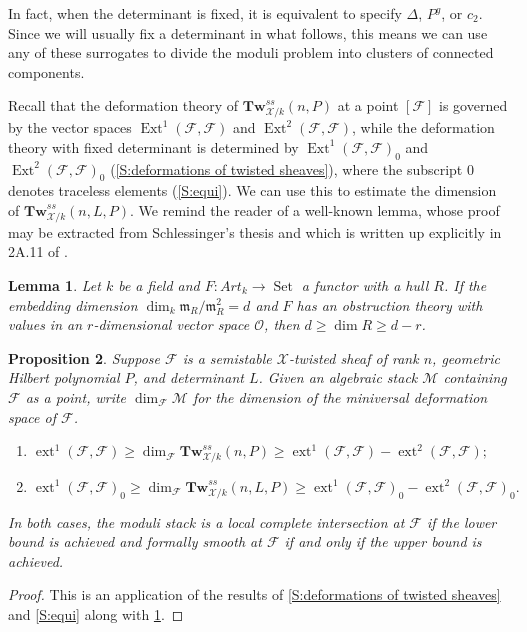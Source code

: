 \documentclass[11pt]{amsart}
\newcommand{\mf}[1]{\mathfrak #1}
\newcommand{\mc}[1]{\mathcal #1}
\newcommand{\ms}[1]{\mathscr #1}
\DeclareMathOperator{\ext}{\operatorname{Ext}}
\DeclareMathOperator{\dimext}{ext}
\renewcommand{\[}{[\!\hspace{0.03em}[}
\renewcommand{\]}{]\!\hspace{0.03em}]}
\renewcommand{\(}{(\!\hspace{0.03em}(}
\renewcommand{\)}{)\!\hspace{0.03em})}
\newcommand{\Tw}{\mathbf{Tw}}
\newtheorem{lem}{Lemma}[subsubsection]%
\newtheorem{prop}[lem]{Proposition}
\theoremstyle{definition}
\theoremstyle{remark}
\begin{document}
In fact, when the determinant is fixed, it is equivalent to specify 
$\Delta$, $P^{g}$, or $c_{2}$.  
Since we will usually fix a determinant in what follows, this means we 
can use any of these surrogates to divide the moduli problem into 
clusters of connected components.  

Recall that the deformation theory of $\Tw^{ss}_{\ms X/k}(n,P)$ at 
a point $[\ms F]$ is governed by the vector spaces $\ext^{1}(\ms F,\ms F)$ and 
$\ext^{2}(\ms F,\ms F)$, while the deformation theory with fixed 
determinant is determined by $\ext^{1}(\ms F,\ms F)_{0}$ and 
$\ext^{2}(\ms F,\ms F)_{0}$ (\ref{S:deformations of twisted sheaves}), where the subscript $0$ denotes 
traceless elements (\ref{S:equi}).  We can use this to 
estimate the dimension of $\Tw^{ss}_{\ms X/k}(n,L,P)$.  
We remind the reader of a well-known lemma, whose proof may be 
extracted from Schlessinger's thesis \cite{schl} and which is written 
up explicitly in 2A.11 of \cite{h-l}.

\begin{lem}\label{L:hull dimension} Let $k$ be a field and $F:Art_{k}\to\operatorname{Set}$ a 
functor with a hull $R$.  If the embedding dimension $\dim_{k}\mf 
m_{R}/\mf m_{R}^{2}=d$ and $F$ has an obstruction theory with values 
in an $r$-dimensional vector space $\mc O$, then $d\geq\dim R\geq d-r$.
\end{lem}

\begin{prop} Suppose $\ms F$ is a semistable $\ms X$-twisted sheaf of 
rank $n$, geometric Hilbert polynomial $P$, and determinant $L$.  Given an algebraic stack $\ms M$ containing $\ms F$ as a 
point, write $\dim_{\ms F}\ms M$ for the dimension of the miniversal 
deformation space of $\ms F$.
\begin{enumerate}
    \item[(i)] $\dimext^{1}(\ms F,\ms F)\geq\dim_{\ms F}\Tw^{ss}_{\ms 
    X/k}(n,P)\geq 
    \dimext^{1}(\ms F,\ms F)-\dimext^{2}(\ms F,\ms F);$

    \item[(ii)] $\dimext^{1}(\ms F,\ms F)_{0}\geq\dim_{\ms 
    F}\Tw^{ss}_{\ms X/k}(n,L,P)\geq 
    \dimext^{1}(\ms F,\ms F)_{0}-\dimext^{2}(\ms F,\ms F)_{0}.$
\end{enumerate}
In both cases, the moduli stack is a local complete intersection at 
$\ms F$ if the lower bound is achieved and formally 
smooth at $\ms F$ if and only if the upper bound is achieved.
\end{prop}
\begin{proof} This is an application of the results of 
\ref{S:deformations of twisted sheaves} and \ref{S:equi} 
along with \ref{L:hull dimension}.
\end{proof}
\end{document}
